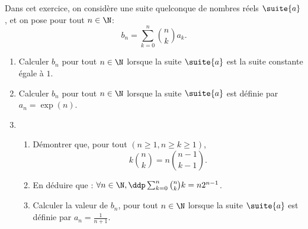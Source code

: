 \documentclass[a4paper, 11pt,reqno]{article}
\begin{document}
\begin{exercice}
Dans cet exercice, on considère une suite quelconque de nombres réels $\suite{a}$, et on pose pour tout $n\in \N$:
$$b_n =\sum_{k=0}^n \binom{n}{k} a_k.$$

\begin{enumerate}
\item Calculer $b_n$ pour tout $n \in \N$ lorsque la suite $\suite{a}$ est la suite constante égale à $1$.
\item Calculer $b_n$ pour tout $n \in \N$ lorsque la suite $\suite{a}$ est définie par $a_n=\exp(n)$. 

\item 
\begin{enumerate}
\item Démontrer que, pour tout $(n\geq 1,n\geq k\geq 1)$, $$k\binom{n}{k}=n \binom{n-1}{k-1}.$$
\item En déduire que : $\forall n \in \N, \ddp \sum_{k=0}^n \binom{n}{k} k = n2^{n-1}$.
\item Calculer la valeur de $b_n$, pour tout $n \in \N$ lorsque la suite $\suite{a}$ est définie par $a_n=\frac{1}{n+1}$. 
\end{enumerate}
\end{enumerate}





\end{exercice}
\end{document}
